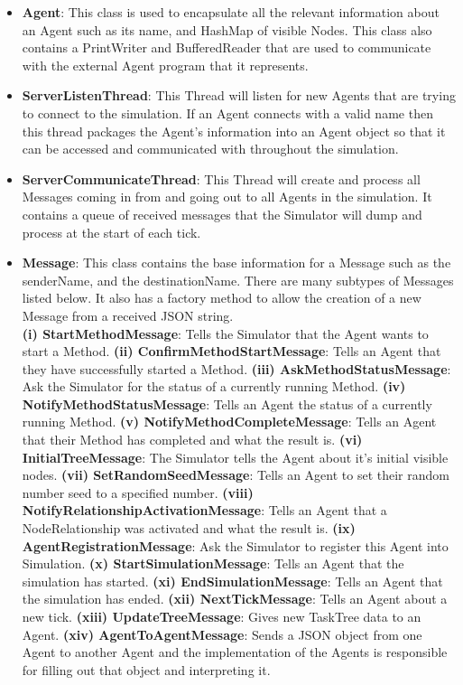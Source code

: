 \begin{enumerate}
\begin{itemize}
\item \textbf{Agent}: This class is used to encapsulate all the relevant information about an Agent such as its name, and HashMap of visible Nodes. This class also contains a PrintWriter and BufferedReader that are used to communicate with the external Agent program that it represents. \\

\item \textbf{ServerListenThread}: This Thread will listen for new Agents that are trying to connect to the simulation. If an Agent connects with a valid name then this thread packages the Agent's information into an Agent object so that it can be accessed and communicated with throughout the simulation. \\

\item \textbf{ServerCommunicateThread}: This Thread will create and process all Messages coming in from and going out to all Agents in the simulation. It contains a queue of received messages that the Simulator will dump and process at the start of each tick.\\

\item \textbf{Message}: This class contains the base information for a Message such as the senderName, and the destinationName. There are many subtypes of Messages listed below. It also has a factory method to allow the creation of a new Message from a received JSON string.\\


\subitem \textbf{(i) StartMethodMessage}: Tells the Simulator that the Agent wants to start a Method.
\subitem \textbf{(ii) ConfirmMethodStartMessage}: Tells an Agent that they have successfully started a Method. 
\subitem \textbf{(iii) AskMethodStatusMessage}: Ask the Simulator for the status of a currently running Method.
\subitem \textbf{(iv) NotifyMethodStatusMessage}: Tells an Agent the status of a currently running Method.
\subitem \textbf{(v) NotifyMethodCompleteMessage}: Tells an Agent that their Method has completed and what the result is.
\subitem \textbf{(vi) InitialTreeMessage}: The Simulator tells the Agent about it's initial visible nodes.
\subitem \textbf{(vii) SetRandomSeedMessage}: Tells an Agent to set their random number seed to a specified number.
\subitem \textbf{(viii) NotifyRelationshipActivationMessage}: Tells an Agent that a NodeRelationship was activated and what the result is.
\subitem \textbf{(ix) AgentRegistrationMessage}: Ask the Simulator to register this Agent into Simulation.
\subitem \textbf{(x) StartSimulationMessage}: Tells an Agent that the simulation has started.
\subitem \textbf{(xi) EndSimulationMessage}: Tells an Agent that the simulation has ended.
\subitem \textbf{(xii) NextTickMessage}: Tells an Agent about a new tick.
\subitem \textbf{(xiii) UpdateTreeMessage}: Gives new TaskTree data to an Agent.
\subitem \textbf{(xiv) AgentToAgentMessage}: Sends a JSON object from one Agent to another Agent and the implementation of the Agents is responsible for filling out that object and interpreting it.\\
\end{itemize}


\end{enumerate}
